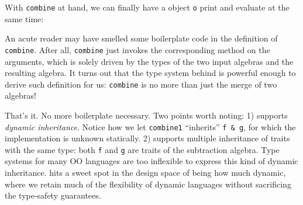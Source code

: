 With \lstinline{combine} at hand, we can finally have a object \lstinline{o}
print and evaluate at the same time:


An acute reader may have smelled some boilerplate code in the definition of
\lstinline{combine}. After all, \lstinline{combine} just invokes the
corresponding method on the arguments, which is solely driven by the types of
the two input algebras and the resulting algebra. It turns out that the type
system behind \name is powerful enough to derive such definition for us:
\lstinline{combine} is no more than just the merge of two algebras!


That's it. No more boilerplate necessary. Two points worth noting: 1) \name
supports \textit{dynamic inheritance}. Notice how we let \lstinline{combine1}
``inherits'' \lstinline{f & g}, for which the implementation is unknown
statically. 2) \name supports multiple inheritance of traits with the same type:
both \lstinline{f} and \lstinline{g} are traits of the subtraction algebra. Type
systems for many OO languages are too inflexible to express this kind of dynamic
inheritance. \name hits a sweet spot in the design space of being how much
dynamic, where we retain much of the flexibility of dynamic languages without
sacrificing the type-safety guarantees.

